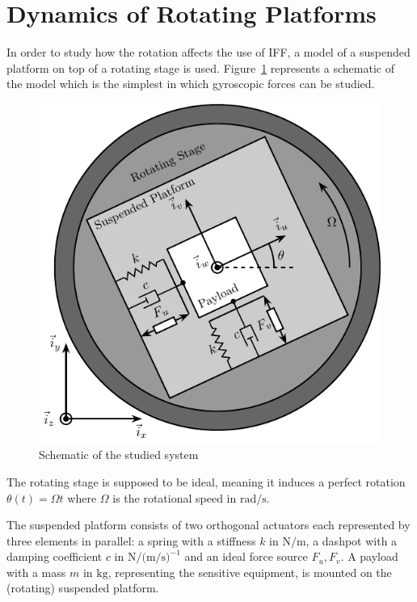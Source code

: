 \documentclass[10pt]{iopart}
\begin{document}
\section{Dynamics of Rotating Platforms}
\label{sec:org414e8cb}
\label{sec:dynamics}
In order to study how the rotation affects the use of IFF, a model of a suspended platform on top of a rotating stage is used.
Figure~\ref{fig:system} represents a schematic of the model which is the simplest in which gyroscopic forces can be studied.

\begin{figure}[htbp]
\centering
\includegraphics[scale=1,scale=0.9]{figs/fig01.pdf}
\caption{\label{fig:system}Schematic of the studied system}
\end{figure}

The rotating stage is supposed to be ideal, meaning it induces a perfect rotation \(\theta(t) = \Omega t\) where \(\Omega\) is the rotational speed in \(\si{\radian\per\s}\).

The suspended platform consists of two orthogonal actuators each represented by three elements in parallel: a spring with a stiffness \(k\) in \(\si{\newton\per\meter}\), a dashpot with a damping coefficient \(c\) in \(\si{\newton\per(\meter\per\second)^{-1}}\) and an ideal force source \(F_u, F_v\).
A payload with a mass \(m\) in \(\si{\kilo\gram}\), representing the sensitive equipment, is mounted on the (rotating) suspended platform.
\end{document}
